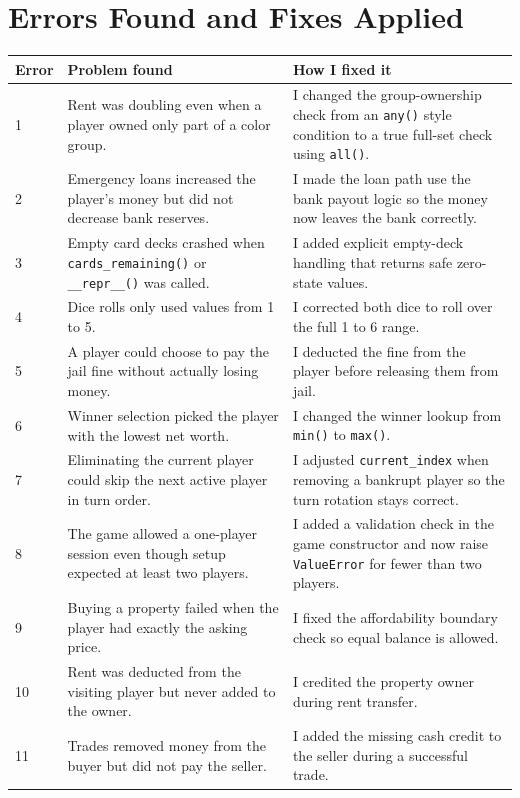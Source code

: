 \documentclass[12pt]{article}
\begin{document}
\section{Errors Found and Fixes Applied}
\begin{longtable}{p{}p{}p{}}
\toprule
\textbf{Error} & \textbf{Problem found} & \textbf{How I fixed it} \\
\midrule
\endhead
1 & Rent was doubling even when a player owned only part of a color group. & I changed the group-ownership check from an \texttt{any()} style condition to a true full-set check using \texttt{all()}. \\
2 & Emergency loans increased the player's money but did not decrease bank reserves. & I made the loan path use the bank payout logic so the money now leaves the bank correctly. \\
3 & Empty card decks crashed when \texttt{cards\_remaining()} or \texttt{\_\_repr\_\_()} was called. & I added explicit empty-deck handling that returns safe zero-state values. \\
4 & Dice rolls only used values from 1 to 5. & I corrected both dice to roll over the full 1 to 6 range. \\
5 & A player could choose to pay the jail fine without actually losing money. & I deducted the fine from the player before releasing them from jail. \\
6 & Winner selection picked the player with the lowest net worth. & I changed the winner lookup from \texttt{min()} to \texttt{max()}. \\
7 & Eliminating the current player could skip the next active player in turn order. & I adjusted \texttt{current\_index} when removing a bankrupt player so the turn rotation stays correct. \\
8 & The game allowed a one-player session even though setup expected at least two players. & I added a validation check in the game constructor and now raise \texttt{ValueError} for fewer than two players. \\
9 & Buying a property failed when the player had exactly the asking price. & I fixed the affordability boundary check so equal balance is allowed. \\
10 & Rent was deducted from the visiting player but never added to the owner. & I credited the property owner during rent transfer. \\
11 & Trades removed money from the buyer but did not pay the seller. & I added the missing cash credit to the seller during a successful trade. \\

\end{longtable}
\end{document}
